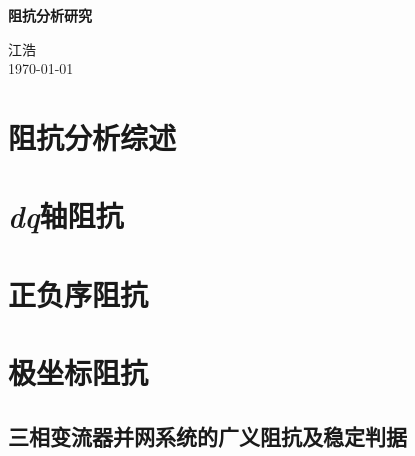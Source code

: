 \documentclass[12pt, a4paper, UTF8, fontset=adobe, scheme=chinese, heading=true, oneside]{ctexbook} %
\begin{document}
\frontmatter
\begin{titlepage}
\begin{center}

\vspace*{5cm}
{\huge \bfseries 阻抗分析研究}\\[0.4cm]

\vspace{12cm}

{\large 江浩} \\[1cm]
{\large \today}

\end{center}
\end{titlepage}

\begin{titlepage}
\begin{center}

\vspace*{8cm}

\end{center}
\end{titlepage}

{
\hypersetup{linkcolor=black} %
\tableofcontents %
}

\mainmatter %

\chapter{阻抗分析综述}

\chapter{\textit{dq}轴阻抗}

\chapter{正负序阻抗}


\chapter{极坐标阻抗}

\section{三相变流器并网系统的广义阻抗及稳定判据}
\end{document}
